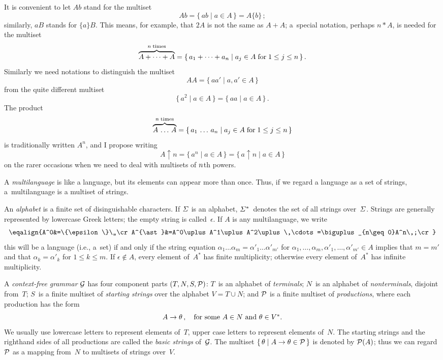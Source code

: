 It is convenient to let $Ab$ stand for the multiset
$$Ab=\{\,ab\mid a\in A\,\}=A\{b\}\,;$$
similarly, $aB$ stands for $\{a\}B$. This means, for example, that
$2A$ is not the same as $A+A$; a~special notation, perhaps $n\ast A$,
is needed for the multiset
$$\overbrace{A+\cdots +A}^{n\;{\rm times}}=\{\,a_1+\cdots +a_n\mid
a_j\in A\;{\rm for}\;1\leq j\leq n\,\}\,.$$
Similarly we need notations to distinguish the multiset
$$AA=\{\,aa'\mid a,a'\in A\,\}$$
from the quite different multiset
$$\{\,a^2\mid a\in A\,\}=\{\,aa\mid a\in A\,\}\,.$$
The product
$$\overbrace{A\,\ldots\,A}^{n\;{\rm times}}=\{\,a_1\,\ldots\,a_n\mid
a_j\in A\;{\rm for}\;1\leq j\leq n\,\}$$
is traditionally written $A^n$, and I propose writing
$$A\uparrow n=\{\,a^n\mid a\in A\,\}=\{\,a\uparrow n\mid a\in A\,\}$$
on the rarer occasions
when we need to deal with multisets of $n\/$th powers.

\enspace
A {\it multilanguage\/} is like a language, but its elements can
appear more than once. Thus, if we regard a language as a set of
strings, a~multilanguage is a multiset of strings.

An {\it alphabet\/} is a finite set of disinguishable characters. If
${\mit\Sigma}$ is an alphabet, ${\mit\Sigma}^{\ast}$~denotes the set
of all strings over~${\mit\Sigma}$. Strings are generally represented by
lowercase Greek letters; the empty string is called~$\epsilon$.
If $A$ is any multilanguage, we write
$$\eqalign{A^0&=\{\epsilon\}\,,\cr
A^{\ast}&=A^0\uplus A^1\uplus A^2\uplus \,\cdots =\biguplus_{n\geq
0}A^n\,;\cr}$$ 
this will be a language (i.e., a~set) if and only if the string
equation $\alpha_1\ldots\alpha_m=\alpha'_1\ldots\alpha'_{m'}$ for
$\alpha_1,\ldots,\alpha_m,\alpha'_1,\ldots,\alpha'_{m'}\in A$ implies
that $m=m'$ and that $\alpha_k=\alpha'_k$ for $1\leq k\leq m$. If
$\epsilon\notin A$, every element of~$A^{\ast}$ has finite
multiplicity; otherwise every element of~$A^{\ast}$ has infinite
multiplicity.

A {\it context-free grammar\/} ${\cal G}$ has four component parts
$(T,N,S,{\cal P})$: $T$~is an alphabet of {\it terminals\/}; $N$~is an
alphabet of {\it nonterminals}, disjoint from~$T$; $S$~is a finite
multiset of {\it starting strings\/} over the alphabet $V=T\cup N$;
and ${\cal P}$ is a finite multiset of {\it productions}, where each
production has the form
$$A\rightarrow\theta\,,\quad\hbox{for some $A\in N$ and $\theta\in
V^{\ast}$}.$$ 
We usually use lowercase letters to represent elements of~$T$, upper
case letters to represent elements of~$N$. The starting strings and
the righthand sides of all productions are called the {\it basic
strings\/} of~${\cal G}$. The multiset $\{\,\theta\mid A\rightarrow
\theta\in {\cal P}\,\}$ is denoted by ${\cal P}(A)$; thus we can
regard ${\cal P}$ as a mapping from~$N$ to multisets of strings
over~$V$.

